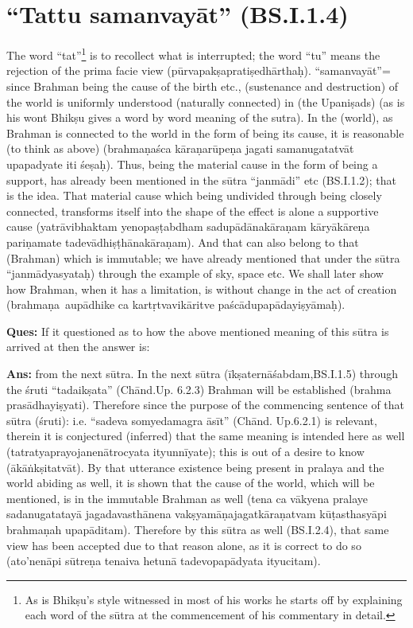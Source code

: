 \section*{“Tattu samanvayāt” (BS.I.1.4)}

The word “tat”\footnote{As is Bhikṣu’s style witnessed in most of his works he starts off by explaining each word of the sūtra at the commencement of his commentary in detail.} is to recollect what is interrupted; the word “tu” means the rejection of the prima facie view (pūrvapakṣapratiṣedhā\-rthaḥ). “samanvayāt”= since Brahman being the cause of the birth etc., (sustenance and destruction) of the world is uniformly understood (naturally connected) in (the Upaniṣads) (as is his wont Bhikṣu gives a word by word meaning of the sutra). In the (world), as Brahman is connected to the world in the form of being its cause, it is reasonable (to think as above) (brahmaṇaśca kāraṇarūpeṇa jagati samanugatatvāt upapadyate iti śeṣaḥ). Thus, being the material cause in the form of being a support, has already been mentioned in the sūtra “janmādi” etc (BS.I.1.2); that is the idea. That material cause which being undivided through being closely connected, transforms itself into the shape of the effect is alone  a supportive cause (yatrāvibhaktam yenopaṣṭabdham sadupādānakāraṇam kāryākāreṇa pariṇamate tadevādhiṣṭhānakāraṇam).  And that can also belong to that (Brahman) which is immutable; we have already mentioned that under the sūtra “janmādyasyataḥ) through the example of sky, space etc. We shall later show how Brahman, when it has a limitation, is without change in the act of creation (brahmaṇa aupādhike ca kartṛtvavikāritve paścādupapādayiṣyāmaḥ).

\textbf{Ques:} If it questioned as to how the above mentioned meaning of this sūtra is arrived at then the answer is: 

\textbf{Ans:} from the next sūtra. In the next sūtra (īkṣaternāśabdam,BS.I.1.5) through the śruti “tadaikṣata” (Chānd.Up. 6.2.3) Brahman will be established (brahma prasādhayiṣyati).  Therefore since the purpose of the commencing sentence of that sūtra (śruti): i.e. “sadeva somyedamagra āsīt” (Chānd. Up.6.2.1) is relevant, therein it is conjectured (inferred) that the same meaning is intended here as well (tatratyaprayojanenātrocyata ityunnīyate); this is out of a desire to know (ākāṅkṣitatvāt). By that utterance existence being present in pralaya and the world abiding as well, it is shown that the cause of the world, which will be mentioned, is in the immutable Brahman as well (tena ca vākyena pralaye sadanugatatayā jagadavasthānena vakṣyamāṇajagatkāraṇatvam kūṭasthasyāpi brahmaṇah upapāditam). Therefore by this sūtra as well (BS.I.2.4), that same view has been accepted due to that reason alone, as it is correct to do so (ato’nenāpi sūtreṇa tenaiva hetunā tadevopapādyata ityucitam).

